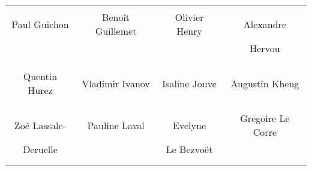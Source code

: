 \begin{center}
\begin{tabular}{cccc}
&&& \\
Paul Guichon & Benoît Guillemet & Olivier Henry & Alexandre\\ & & & Hervou \\ \\ \\ 

&&& \\
Quentin Hurez & Vladimir Ivanov & Isaline Jouve & Augustin Kheng \\ \\ \\ 

&&& \\
Zoé Lassale- & Pauline Laval & Evelyne & Gregoire Le Corre \\ Deruelle & & Le Bezvoët & \\ \\ \\ 

\end{tabular}
\end{center}
	
\vfill
\pagebreak

